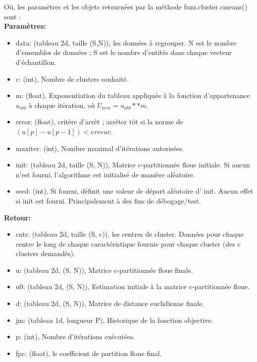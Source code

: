 \noindent Où, les paramètres et les objets retournées par la méthode \colorbox{gray!30}{fuzz.cluster.cmeans()}  sont : \\
\textbf{Paramètres:}

\begin{itemize}
	\item data: (tableau 2d, taille (S,N)), les données à regrouper. N est le nombre d'ensembles de données ; S est le nombre d'entités dans chaque vecteur d'échantillon. 
	\item c: (int), Nombre de clusters souhaité.
	\item m: (float), Exponentiation du tableau appliquée à la fonction d'appartenance \(\displaystyle u_{old} \) à chaque itération, où \(\displaystyle U_{new} = u_{old} ** m \). 
	\item error: (float), critère d'arrêt ; arrêter tôt si la norme de \(\displaystyle (u[p] - u[p-1]) < erreur \). 
	\item maxiter: (int), Nombre maximal d'itérations autorisées.
	\item init: (tableau 2d, taille (S, N)), Matrice c-partitionnée floue initiale. Si aucun n'est fourni, l'algorithme est initialisé de manière aléatoire.
	\item seed: (int), Si fourni, définit une valeur de départ aléatoire d' \colorbox{gray!30}{init}. Aucun effet si \colorbox{gray!30}{init} est fourni. Principalement à des fins de débogage/test.
\end{itemize}


\noindent \textbf{Retour:}

\begin{itemize}
	\item cntr: (tableau 2d, taille (S, c)), les centres de cluster. Données pour chaque centre le long de chaque caractéristique fournie pour chaque cluster (des \colorbox{gray!30}{c} clusters demandés).
	\item u: (tableau 2d, (S, N)), Matrice c-partitionnée floue finale.
	\item u0: (tableau 2d, (S, N)), Estimation initiale à la matrice c-partitionnée floue.
	\item d: (tableau 2d, (S, N)), Matrice de distance euclidienne finale.
	\item jm: (tableau 1d, longueur P), Historique de la fonction objective.
	\item p: (int), Nombre d'itérations exécutées.
	\item fpc: (float), le coefficient de partition floue final.
\end{itemize}

